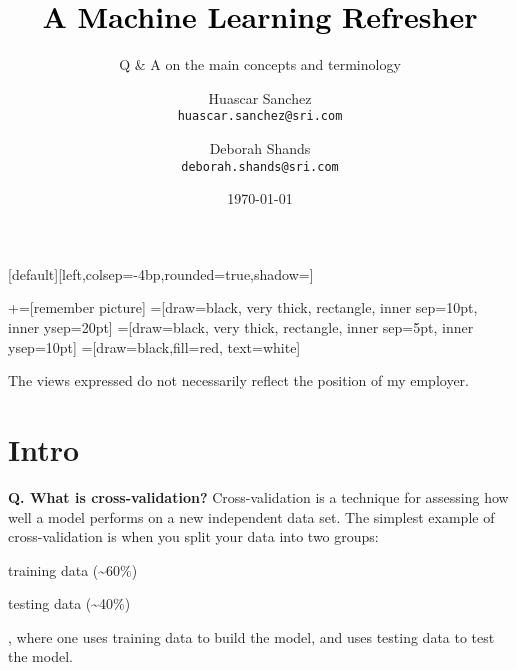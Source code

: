 

\usepackage{framed}
\usepackage[inline]{enumitem}

\title[]{\Huge \textbf{\textcolor{black}{A Machine Learning Refresher}}}
\subtitle{\Large Q \& A on the main concepts and terminology}
\author[HAS \& DS]{
\parbox[t]{1.5in}{Huascar Sanchez \\\small\texttt{huascar.sanchez@sri.com}} \hspace{.3in}
\and
\parbox[t]{1.5in}{Deborah Shands \\\small\texttt{deborah.shands@sri.com}}
}

\date{\today}

\makeatletter
{}[default][left,colsep=-4bp,rounded=true,shadow=\beamer@themerounded@shadow]
\makeatother


\newcommand\marktopleft[1]{%
    \tikz[overlay,remember picture]
        \node (marker-#1-a) at (-.3em,.3em) {};%
}
\newcommand\markbottomright[2]{%
    \tikz[overlay,remember picture]
        \node (marker-#1-b) at (0em,0em) {};%
}
+=[remember picture]
 =[draw=black, very thick, rectangle, inner sep=10pt, inner ysep=20pt]
 =[draw=black, very thick, rectangle, inner sep=5pt, inner ysep=10pt]
 =[draw=black,fill=red, text=white]

\begin{frame}
\maketitle
\tiny\hspace{1em}The views expressed do not necessarily reflect the position of my employer.
\end{frame}

\section{Intro}
\begin{frame}[fragile]{\textbf{Q. What is cross-validation?}}
Cross-validation is a technique for assessing how well a model
performs on a new independent data set. The simplest example of
cross-validation is when you split your data into two groups:
\begin{enumerate*}[label=(\arabic*),itemsep=5pt]
\item training data (\~{}60\%)
\item testing data (\~{}40\%)
\end{enumerate*}, where one uses training data to build the model,
and uses testing data to test the model.
\end{frame}


